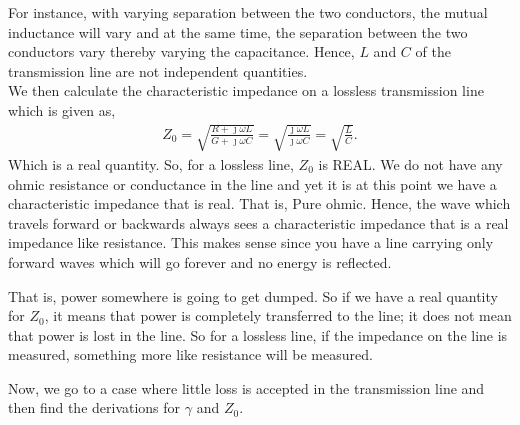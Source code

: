For instance, with varying separation between the two conductors, the mutual inductance will vary and at the same time, the separation between the two conductors vary thereby varying the capacitance. Hence, $L$ and $C$ of the transmission line are not independent quantities.\\
We then calculate the characteristic impedance on a lossless transmission line which is given as,
\begin{align*}
Z_0 = \sqrt{\frac{R + \jmath\omega L}{G + \jmath\omega C}} = \sqrt{\frac{\jmath\omega L}{\jmath\omega C}} = \sqrt{\frac{L}{C}}.
\end{align*}
Which is a real quantity. So, for a lossless line, $Z_0$ is REAL. We do not have any ohmic resistance or conductance in the line and yet it is at this point we have a characteristic impedance that is real. That is, Pure ohmic. Hence, the wave which travels forward or backwards always sees a characteristic impedance that is a real impedance like resistance. This makes sense since you have a line carrying only forward waves which will go forever and no energy is reflected. 

That is, power somewhere is going to get dumped. So if we have a real quantity for $Z_0$, it means that power is completely transferred to the line; it does not mean that power is lost in the line. So for a lossless line, if the impedance on the line is measured, something more like resistance will be measured.

Now, we go to a case where little loss is accepted in the transmission line and then find the derivations for $\gamma$ and $Z_0$.
